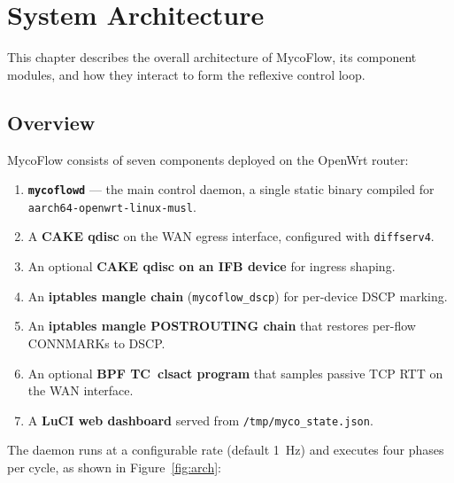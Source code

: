 
\chapter{System Architecture}\label{chapter:architecture}

This chapter describes the overall architecture of MycoFlow, its component modules, and how they interact to form the reflexive control loop.

\section{Overview}

MycoFlow consists of seven components deployed on the OpenWrt router:

\begin{enumerate}
  \item \textbf{\texttt{mycoflowd}} --- the main control daemon, a single static binary compiled for \texttt{aarch64-openwrt-linux-musl}.
  \item A \textbf{CAKE qdisc} on the WAN egress interface, configured with \texttt{diffserv4}.
  \item An optional \textbf{CAKE qdisc on an IFB device} for ingress shaping.
  \item An \textbf{iptables mangle chain} (\texttt{mycoflow\_dscp}) for per-device DSCP marking.
  \item An \textbf{iptables mangle POSTROUTING chain} that restores per-flow CONNMARKs to DSCP.
  \item An optional \textbf{BPF TC~clsact program} that samples passive TCP RTT on the WAN interface.
  \item A \textbf{LuCI web dashboard} served from \texttt{/tmp/myco\_state.json}.
\end{enumerate}

The daemon runs at a configurable rate (default 1~Hz) and executes four phases per cycle, as shown in Figure~\ref{fig:arch}:

